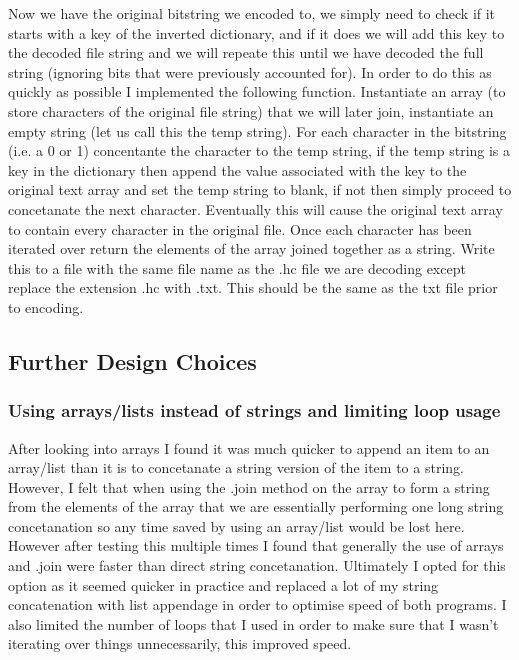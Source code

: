 \documentclass{mm2}
\begin{document}
Now we have the original bitstring we encoded to, we simply need to check if it starts with a key of the inverted dictionary, and if it does we will add this key to the decoded file string and we will repeate this until we have decoded the full string (ignoring bits that were previously accounted for). In order to do this as quickly as possible I implemented the following function. Instantiate an array (to store characters of the original file string) that we will later join, instantiate an empty string (let us call this the temp string). For each character in the bitstring (i.e. a 0 or 1) concentante the character to the temp string, if the temp string is a key in the dictionary then append the value associated with the key to the original text array and set the temp string to blank, if not then simply proceed to concetanate the next character. Eventually this will cause the original text array to contain every character in the original file. Once each character has been iterated over return the elements of the array joined together as a string. Write this to a file with the same file name as the .hc file we are decoding except replace the extension .hc with .txt. This should be the same as the txt file prior to encoding.
\subsection{Further Design Choices}
\subsubsection{Using arrays/lists instead of strings and limiting loop usage}
After looking into arrays I found it was much quicker to append an item to an array/list than it is to concetanate a string version of the item to a string. However, I felt that when using the .join method on the array to form a string from the elements of the array that we are essentially performing one long string concetanation so any time saved by using an array/list would be lost here. However after testing this multiple times I found that generally the use of arrays and .join were faster than direct string concetanation. Ultimately I opted for this option as it seemed quicker in practice and replaced a lot of my string concatenation with list appendage in order to optimise speed of both programs. I also limited the number of loops that I used in order to make sure that I wasn't iterating over things unnecessarily, this improved speed.
\end{document}
